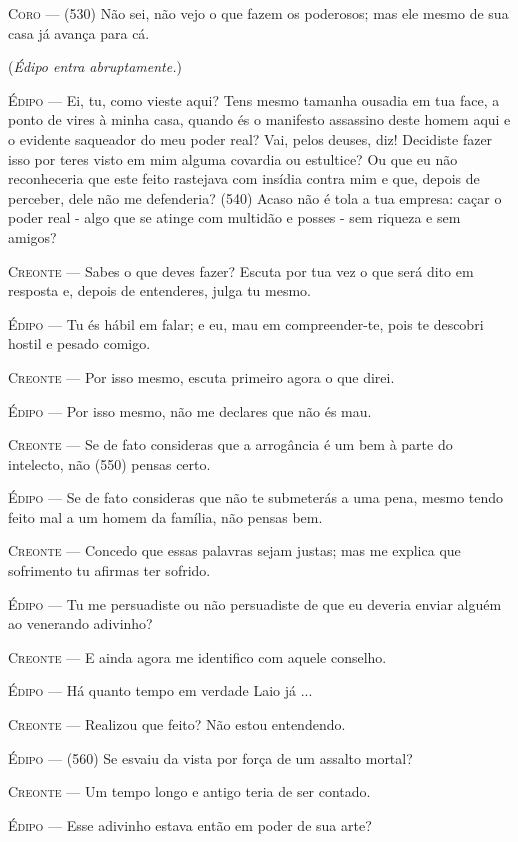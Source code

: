 \textsc{Coro} --- (530) Não sei, não vejo o que fazem os poderosos; mas ele mesmo de sua
casa já avança para cá.

(\emph{Édipo entra abruptamente.})

\textsc{Édipo} --- Ei, tu, como vieste aqui? Tens mesmo tamanha ousadia em tua face, a
ponto de vires à minha casa, quando és o manifesto assassino deste homem
aqui e o evidente saqueador do meu poder real? Vai, pelos deuses, diz!
Decidiste fazer isso por teres visto em mim alguma covardia ou
estultice? Ou que eu não reconheceria que este feito rastejava com
insídia contra mim e que, depois de perceber, dele não me defenderia?
(540) Acaso não é tola a tua empresa: caçar o poder real - algo que se
atinge com multidão e posses - sem riqueza e sem amigos?

\textsc{Creonte} --- Sabes o que deves fazer? Escuta por tua vez o que será dito em resposta
e, depois de entenderes, julga tu mesmo.

\textsc{Édipo} --- Tu és hábil em falar; e eu, mau em compreender-te, pois te descobri
hostil e pesado comigo.

\textsc{Creonte} --- Por isso mesmo, escuta primeiro agora o que direi.

\textsc{Édipo} --- Por isso mesmo, não me declares que não és mau.

\textsc{Creonte} --- Se de fato consideras que a arrogância é um bem à parte do intelecto,
não (550) pensas certo.

\textsc{Édipo} --- Se de fato consideras que não te submeterás a uma pena, mesmo tendo
feito mal a um homem da família, não pensas bem.

\textsc{Creonte} --- Concedo que essas palavras sejam justas; mas me explica que sofrimento
tu afirmas ter sofrido.

\textsc{Édipo} --- Tu me persuadiste ou não persuadiste de que eu deveria enviar alguém ao
venerando adivinho?

\textsc{Creonte} --- E ainda agora me identifico com aquele conselho.

\textsc{Édipo} --- Há quanto tempo em verdade Laio já ...

\textsc{Creonte} --- Realizou que feito? Não estou entendendo.

\textsc{Édipo} --- (560) Se esvaiu da vista por força de um assalto mortal?

\textsc{Creonte} --- Um tempo longo e antigo teria de ser contado.

\textsc{Édipo} --- Esse adivinho estava então em poder de sua arte?

